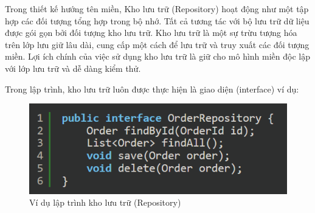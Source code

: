  Trong thiết kế hướng tên miền,       Kho lưu trữ (Repository)        hoạt động như một tập hợp các đối tượng tổng hợp trong bộ nhớ.      Tất cả     tương tác với bộ lưu trữ dữ liệu được gói gọn bởi đối tượng kho lưu trữ.    Kho lưu trữ    là một sự trừu tượng hóa trên lớp lưu giữ lâu dài, cung cấp một cách để lưu trữ và truy xuất các đối tượng miền.       Lợi ích chính của việc sử dụng kho lưu trữ là   giữ cho mô hình miền độc lập với lớp lưu trữ và dễ dàng kiểm thử.
 
 

 
 
 
  
 
 
 
 





 


\begin{example} Trong lập trình,  kho lưu trữ luôn được thực hiện là giao diện (interface) ví dụ:

    
\begin{figure}[H]

    \centering
    
    \includegraphics[scale = 0.4]{pictures/_vi_du_lap_trinh_kho_luu_tru_repository/main.png}
    
    \caption{Ví dụ  lập trình  kho lưu trữ (Repository)}
    
    \end{figure}
\end{example}